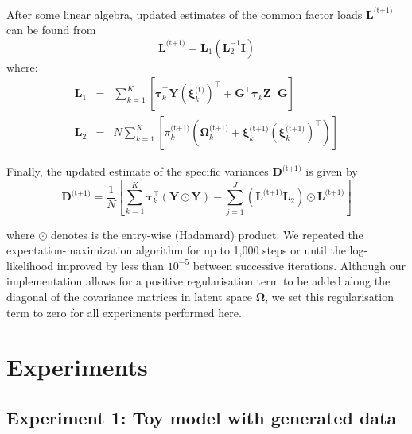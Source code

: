 \documentclass[twocolumn]{aastex61}
\newcommand{\vect}[1]{\boldsymbol{\mathbf{#1}}}
\renewcommand{\vec}[1]{\vect{#1}}
\newcommand{\weight}{\pi}
\newcommand{\data}{\textbf{Y}}
\newcommand{\vecdata}{\vec\data}
\newcommand{\nextstep}{^\textrm{(t+1)}}
\newcommand{\thisstep}{^\textrm{(t)}}
\newcommand{\transpose}{^\intercal}
\newcommand{\eye}{\textbf{I}}
\newcommand{\factorloads}{\textbf{L}}
\newcommand{\specificvariance}{\vec{D}}
\newcommand{\scoremeans}{\vec\xi}
\newcommand{\scorecovs}{\vec\Omega}
\newcommand{\NumData}{N}
\newcommand{\NumComponents}{K}
\newcommand{\numcomponents}{k}
\begin{document}
After some linear algebra, updated estimates of the common factor loads $\factorloads\nextstep$
can be found from
\begin{equation}
	\factorloads\nextstep = \factorloads_{1}\left(\factorloads_{2}^{-1}\eye\right)
\end{equation}
\noindent{}where:
\begin{eqnarray}
	\factorloads_1 &=& \sum_{\numcomponents=1}^{\NumComponents}\left[ \vec\tau_\numcomponents\transpose\vecdata\left(\scoremeans_\numcomponents\thisstep\right)\transpose + 
	\vec{G}\transpose\vec\tau_\numcomponents\vec{Z}\transpose\vec{G}\right] \\
	\factorloads_2 &=& N\sum_{\numcomponents=1}^{\NumComponents}\left[\weight_\numcomponents\nextstep\left(\scorecovs_\numcomponents\nextstep + \scoremeans_\numcomponents\nextstep\left(\scoremeans_\numcomponents\nextstep\right)\transpose\right)\right]
\end{eqnarray}


Finally, the updated estimate of the specific variances $\specificvariance\nextstep$ is given
by
\begin{equation}
	\specificvariance\nextstep = \frac{1}{\NumData}\left[\sum^{\NumComponents}_{\numcomponents=1}\vec\tau_\numcomponents\transpose\left(\vecdata\odot\vecdata\right) - \sum_{j=1}^{J}\left(\factorloads\nextstep\factorloads_2\right)\odot\factorloads\nextstep\right]
\end{equation}

\noindent{}where $\odot$ denotes is the entry-wise (Hadamard) product. We repeated
the expectation-maximization algorithm for up to 1,000 steps or until the log-likelihood
improved by less than $10^{-5}$ between successive iterations. Although our implementation
allows for a positive regularisation term to be added along the diagonal of the covariance
matrices in latent space $\scorecovs$, we set this regularisation term to zero for all
experiments performed here.



\section{Experiments} \label{sec:experiments}


\subsection{Experiment 1: Toy model with generated data} \label{sec:experiment-toy-model}
\end{document}
